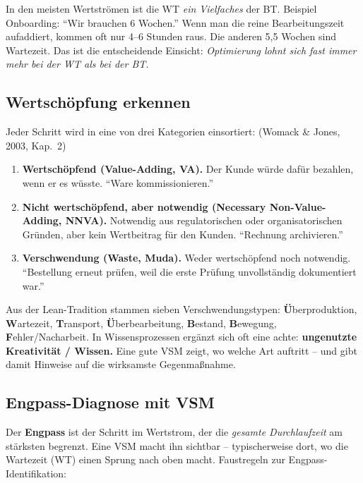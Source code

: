 \documentclass[11pt,a4paper,oneside]{article}
\newcommand{\fachbegriff}[1]{\textbf{#1}}
\newcommand{\quelle}[1]{{\footnotesize\color{lpGray}(#1)}}
\begin{document}
In den meisten Wertströmen ist die WT \emph{ein Vielfaches} der BT. Beispiel Onboarding: ``Wir brauchen 6 Wochen.'' Wenn man die reine Bearbeitungszeit aufaddiert, kommen oft nur 4--6 Stunden raus. Die anderen 5,5 Wochen sind Wartezeit. Das ist die entscheidende Einsicht: \emph{Optimierung lohnt sich fast immer mehr bei der WT als bei der BT.}

\subsection{Wertschöpfung erkennen}

Jeder Schritt wird in eine von drei Kategorien einsortiert: \quelle{Womack \& Jones, 2003, Kap.~2}

\begin{enumerate}
  \item \fachbegriff{Wertschöpfend (Value-Adding, VA).} Der Kunde würde dafür bezahlen, wenn er es wüsste. ``Ware kommissionieren.''
  \item \fachbegriff{Nicht wertschöpfend, aber notwendig (Necessary Non-Value-Adding, NNVA).} Notwendig aus regulatorischen oder organisatorischen Gründen, aber kein Wertbeitrag für den Kunden. ``Rechnung archivieren.''
  \item \fachbegriff{Verschwendung (Waste, Muda).} Weder wertschöpfend noch notwendig. ``Bestellung erneut prüfen, weil die erste Prüfung unvollständig dokumentiert war.''
\end{enumerate}

\begin{merkbox}
Aus der Lean-Tradition stammen sieben Verschwendungstypen: \textbf{Ü}berproduktion, \textbf{W}artezeit, \textbf{T}ransport, \textbf{Ü}berbearbeitung, \textbf{B}estand, \textbf{B}ewegung, \textbf{F}ehler/Nacharbeit. In Wissensprozessen ergänzt sich oft eine achte: \textbf{ungenutzte Kreativität / Wissen.} Eine gute VSM zeigt, wo welche Art auftritt -- und gibt damit Hinweise auf die wirksamste Gegenmaßnahme.
\end{merkbox}

\subsection{Engpass-Diagnose mit VSM}

Der \fachbegriff{Engpass} ist der Schritt im Wertstrom, der die \emph{gesamte Durchlaufzeit} am stärksten begrenzt. Eine VSM macht ihn sichtbar -- typischerweise dort, wo die Wartezeit (WT) einen Sprung nach oben macht. Faustregeln zur Engpass-Identifikation:
\end{document}
